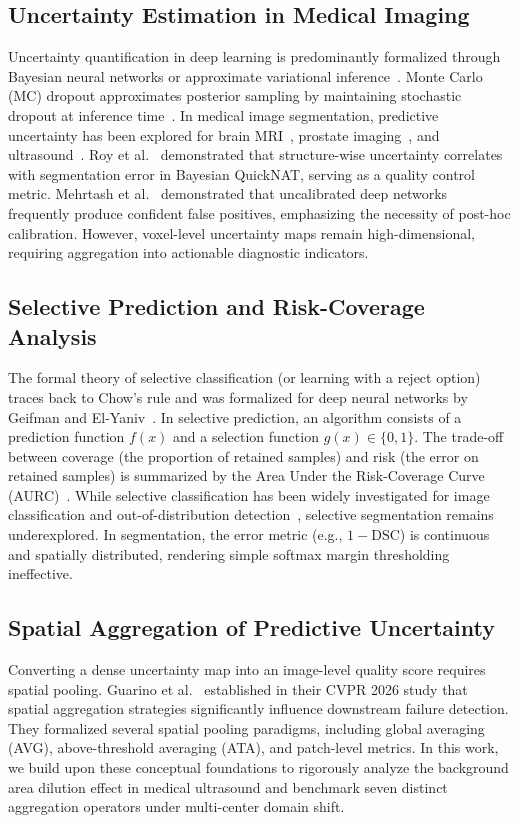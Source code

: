 \documentclass[10pt,journal,compsoc]{IEEEtran}
\begin{document}
\subsection{Uncertainty Estimation in Medical Imaging}
Uncertainty quantification in deep learning is predominantly formalized through Bayesian neural networks or approximate variational inference~\cite{gal2016dropout,kendall2017uncertainties}. Monte Carlo (MC) dropout approximates posterior sampling by maintaining stochastic dropout at inference time~\cite{gal2016dropout}. In medical image segmentation, predictive uncertainty has been explored for brain MRI~\cite{roy2019bayesian,jungo2020analyzing}, prostate imaging~\cite{mehrtash2020confidence}, and ultrasound~\cite{koleilat2026medclipseg}. Roy et al.~\cite{roy2019bayesian} demonstrated that structure-wise uncertainty correlates with segmentation error in Bayesian QuickNAT, serving as a quality control metric. Mehrtash et al.~\cite{mehrtash2020confidence} demonstrated that uncalibrated deep networks frequently produce confident false positives, emphasizing the necessity of post-hoc calibration. However, voxel-level uncertainty maps remain high-dimensional, requiring aggregation into actionable diagnostic indicators.

\subsection{Selective Prediction and Risk-Coverage Analysis}
The formal theory of selective classification (or learning with a reject option) traces back to Chow's rule and was formalized for deep neural networks by Geifman and El-Yaniv~\cite{geifman2017selective}. In selective prediction, an algorithm consists of a prediction function $f(x)$ and a selection function $g(x) \in \{0, 1\}$. The trade-off between coverage (the proportion of retained samples) and risk (the error on retained samples) is summarized by the Area Under the Risk-Coverage Curve (AURC)~\cite{geifman2017selective}. While selective classification has been widely investigated for image classification and out-of-distribution detection~\cite{devries2018learning}, selective segmentation remains underexplored. In segmentation, the error metric (e.g., $1 - \mathrm{DSC}$) is continuous and spatially distributed, rendering simple softmax margin thresholding ineffective.

\subsection{Spatial Aggregation of Predictive Uncertainty}
Converting a dense uncertainty map into an image-level quality score requires spatial pooling. Guarino et al.~\cite{guarino2026better} established in their CVPR 2026 study that spatial aggregation strategies significantly influence downstream failure detection. They formalized several spatial pooling paradigms, including global averaging (AVG), above-threshold averaging (ATA), and patch-level metrics. In this work, we build upon these conceptual foundations to rigorously analyze the background area dilution effect in medical ultrasound and benchmark seven distinct aggregation operators under multi-center domain shift.
\end{document}
